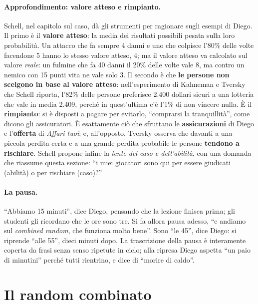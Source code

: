 \paragraph{Approfondimento: valore atteso e rimpianto.} Schell, nel capitolo sul caso, dà
gli strumenti per ragionare sugli esempi di Diego. Il primo è il \textbf{valore atteso}:
la media dei risultati possibili pesata sulla loro probabilità. Un attacco che fa sempre 4
danni e uno che colpisce l'80\% delle volte facendone 5 hanno lo stesso valore atteso, 4;
ma il valore atteso va calcolato sul valore \emph{reale}: un fulmine che fa 40 danni il 20\%
delle volte vale 8, ma contro un nemico con 15 punti vita ne vale solo 3. Il secondo è che
\textbf{le persone non scelgono in base al valore atteso}: nell'esperimento di Kahneman e
Tversky che Schell riporta, l'82\% delle persone preferisce 2.400 dollari sicuri a una
lotteria che vale in media 2.409, perché in quest'ultima c'è l'1\% di non vincere nulla. È il
\textbf{rimpianto}: si è disposti a pagare per evitarlo, ``comprarsi la tranquillità'',
come dicono gli assicuratori. È esattamente ciò che sfruttano le \textbf{assicurazioni} di
Diego e l'\textbf{offerta} di \emph{Affari tuoi}; e, all'opposto, Tversky osserva che davanti
a una piccola perdita certa e a una grande perdita probabile le persone \textbf{tendono a
rischiare}. Schell propone infine la \emph{lente del caso e dell'abilità}, con una domanda che
riassume questa sezione: ``i miei giocatori sono qui per essere giudicati (abilità) o per
rischiare (caso)?''

\paragraph{La pausa.} ``Abbiamo 15 minuti'', dice Diego, pensando che la lezione finisca
prima; gli studenti gli ricordano che le ore sono tre. Si fa allora pausa adesso, ``e
andiamo sul \emph{combined random}, che funziona molto bene''. Sono ``le 45'', dice Diego: si riprende ``alle 55'',
dieci minuti dopo. La trascrizione della pausa è interamente coperta da frasi senza senso ripetute in
ciclo; alla ripresa Diego aspetta ``un paio di minutini'' perché tutti rientrino, e dice di
``morire di caldo''.

\section{Il random combinato}
\label{a15:sec:combinato}

